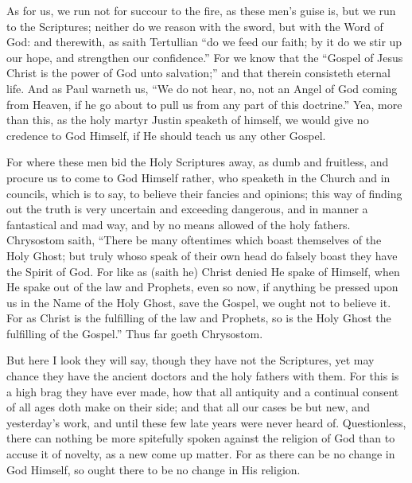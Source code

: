 As for us, we run not for succour to the fire, as these
men’s guise is, but we run to the Scriptures; neither do we reason
with the sword, but with the Word of God: and therewith, as saith Tertullian
“do we feed our faith; by it do we stir up our hope, and strengthen
our confidence.” For we know that the “Gospel of Jesus
Christ is the power of God unto salvation;” and that therein consisteth
eternal life. And as Paul warneth us, “We do not hear, no,
not an Angel of God coming from Heaven, if he go about to pull us from
any part of this doctrine.” Yea, more than this, as the
holy martyr Justin speaketh of himself, we would give no credence to
God Himself, if He should teach us any other Gospel.

For where these men bid the Holy Scriptures away, as dumb and fruitless,
and procure us to come to God Himself rather, who speaketh in the Church
and in councils, which is to say, to believe their fancies and opinions;
this way of finding out the truth is very uncertain and exceeding dangerous,
and in manner a fantastical and mad way, and by no means allowed of
the holy fathers. Chrysostom saith, “There be many oftentimes
which boast themselves of the Holy Ghost; but truly whoso speak of their
own head do falsely boast they have the Spirit of God. For like
as (saith he) Christ denied He spake of Himself, when He spake out of
the
law and Prophets, even so now, if anything be pressed upon us in the
Name of the Holy Ghost, save the Gospel, we ought not to believe it.
For as Christ is the fulfilling of the law and Prophets, so is the Holy
Ghost the fulfilling of the Gospel.” Thus far goeth Chrysostom.


But here I look they will say, though they have not the Scriptures,
yet may chance they have the ancient doctors and the holy fathers with
them. For this is a high brag they have ever made, how that all
antiquity and a continual consent of all ages doth make on their side;
and that all our cases be but new, and yesterday’s work, and until
these few late years were never heard of. Questionless, there
can nothing be more spitefully spoken against the religion of God than
to accuse it of novelty, as a new come up matter. For as there
can be no change in God Himself, so ought there to be no change in His
religion.

